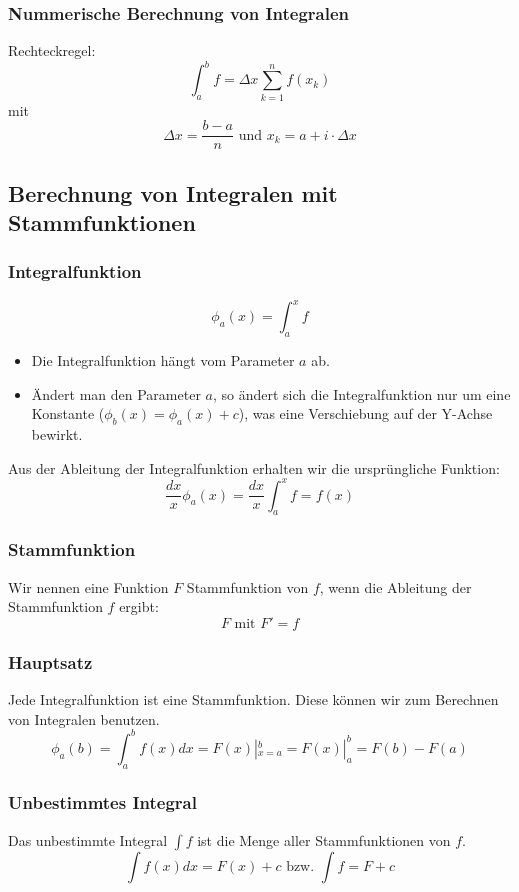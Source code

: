 \subsubsection{Nummerische Berechnung von Integralen}
Rechteckregel:
\[ \int^b_a f =  \Delta x \sum_{k=1}^{n}f(x_k) \]
mit
\[ \Delta x = \frac{b-a}{n} \text{ und } x_k = a + i \cdot \Delta x \]

\subsection{Berechnung von Integralen mit Stammfunktionen}
\subsubsection{Integralfunktion}
\[ \phi_a(x) = \int_a^x f \]
\begin{itemize}
  \item Die Integralfunktion hängt vom Parameter $a$ ab.
  \item Ändert man den Parameter $a$, so ändert sich die
  Integralfunktion nur um eine Konstante ($\phi_b(x) = \phi_a(x) + c$),
  was eine Verschiebung auf der Y-Achse bewirkt.
\end{itemize}

Aus der Ableitung der Integralfunktion erhalten wir die ursprüngliche Funktion:
\[ \frac{dx}{x} \phi_a(x) = \frac{dx}{x} \int_a^x f = f(x) \]

\subsubsection{Stammfunktion}
Wir nennen eine Funktion $F$ Stammfunktion von $f$, wenn die Ableitung
der Stammfunktion $f$ ergibt:
\[F \text{ mit } F' = f\]

\subsubsection{Hauptsatz}
Jede Integralfunktion ist eine Stammfunktion. Diese können wir zum
Berechnen von Integralen benutzen.
\[\phi_a(b) = \int_a^b f(x)dx = F(x)|^b_{x=a} = F(x)|^b_a = F(b) - F(a) \]

\subsubsection{Unbestimmtes Integral}
Das unbestimmte Integral $\int f$ ist die Menge aller Stammfunktionen
von $f$.
\[ \int f(x) dx = F(x) + c \text{ bzw. } \int f = F + c\]

